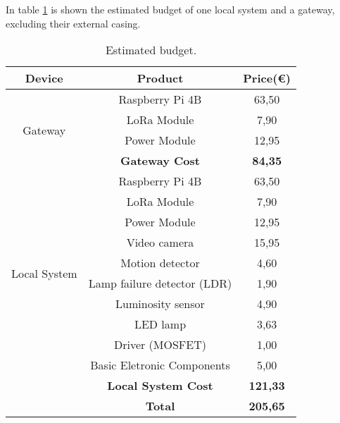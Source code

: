 In table \ref{table:data} is shown the estimated budget of one local system and a gateway, excluding their external casing.

\begin{table}[ht]
	\centering
	
	\begin{tabular}{||c | c | c||} 
		\hline
		\textbf{Device} & \textbf{Product} & \textbf{Price(€)}\\
		\hline\hline
		
		\multirow{4}{4em}{Gateway} & Raspberry Pi 4B & 63,50				\\
								   & LoRa Module & 7,90 					\\
								   & Power Module & 12,95	\\
								   & \textbf{Gateway Cost} & \textbf{84,35}	\\
		\hline
		
		\multirow{10}{4em}{Local System} & Raspberry Pi 4B & 63,50					\\
								         & LoRa Module & 7,90 						\\
								         & Power Module & 12,95						\\
								         & Video camera & 15,95						\\
								         & Motion detector & 4,60					\\
   								         & Lamp failure detector (LDR) & 1,90		\\
								         & Luminosity sensor & 4,90					\\
								         & LED lamp & 3,63							\\
								         & Driver (MOSFET) & 1,00					\\
								         & Basic Eletronic Components & 5,00		\\
								         & \textbf{Local System Cost} & \textbf{121,33}\\
		\hline\hline
		 & \textbf{Total} & \textbf{205,65}\\\hline
	\end{tabular}
	\caption{Estimated budget.}
	\label{table:data}
\end{table}

